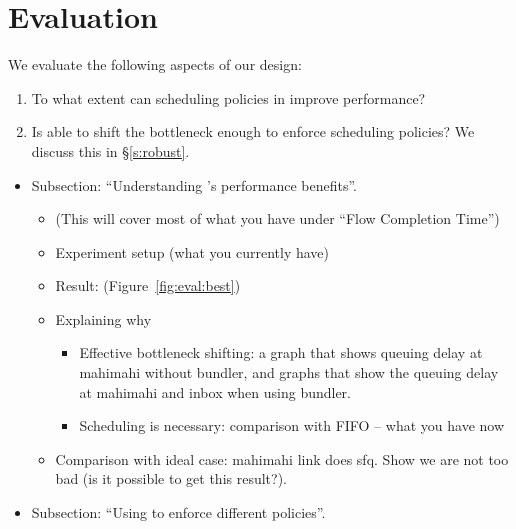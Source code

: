 \section{Evaluation}\label{s:eval}

We evaluate the following aspects of our design:
\begin{enumerate}
    \item To what extent can scheduling policies in \name improve performance?
    \item Is \name able to shift the bottleneck enough to enforce scheduling policies? We discuss this in \S\ref{s:robust}.
\end{enumerate}



\begin{itemize}
    \item Subsection: ``Understanding \name's performance benefits''. 
    \begin{itemize}
        \item (This will cover most of what you have under ``Flow Completion Time'')
        \item Experiment setup (what you currently have)
        \item Result: (Figure~\ref{fig:eval:best})
        \item Explaining why
        \begin{itemize}
            \item Effective bottleneck shifting: a graph that shows queuing delay at mahimahi without bundler, and graphs that show the queuing delay at mahimahi and inbox when using bundler. 
            \item Scheduling is necessary: comparison with FIFO -- what you have now
        \end{itemize}
        \item Comparison with ideal case: mahimahi link does sfq. Show we are not too bad (is it possible to get this result?). 
    \end{itemize}
    \item Subsection: ``Using \name to enforce different policies''.
    

\end{itemize}
